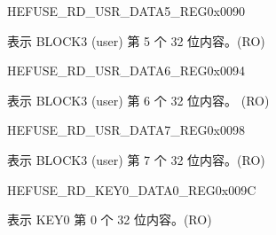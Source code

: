 \begin{register}{H}{EFUSE\_RD\_USR\_DATA5\_REG}{0x{}0090}\label{regdesc:EFUSERDUSRDATA5REG}
%
\regnewline%
\begin{regdesc}\begin{reglist}
\label{fielddesc:EFUSEUSRDATA5}\item [EFUSE\_USR\_DATA5] 表示 BLOCK3 (user) 第 5 个 32 位内容。(RO)
\end{reglist}\end{regdesc}
\end{register}


\begin{register}{H}{EFUSE\_RD\_USR\_DATA6\_REG}{0x{}0094}\label{regdesc:EFUSERDUSRDATA6REG}
%
\regnewline%
\begin{regdesc}\begin{reglist}
\label{fielddesc:EFUSEUSRDATA6}\item [EFUSE\_USR\_DATA6] 表示 BLOCK3 (user) 第 6 个 32 位内容。 (RO)
\end{reglist}\end{regdesc}
\end{register}


\begin{register}{H}{EFUSE\_RD\_USR\_DATA7\_REG}{0x{}0098}\label{regdesc:EFUSERDUSRDATA7REG}
%
\regnewline%
\begin{regdesc}\begin{reglist}
\label{fielddesc:EFUSEUSRDATA7}\item [EFUSE\_USR\_DATA7] 表示 BLOCK3 (user) 第 7 个 32 位内容。(RO)
\end{reglist}\end{regdesc}
\end{register}


\begin{register}{H}{EFUSE\_RD\_KEY0\_DATA0\_REG}{0x{}009C}\label{regdesc:EFUSERDKEY0DATA0REG}
%
\regnewline%
\begin{regdesc}\begin{reglist}
\label{fielddesc:EFUSEKEY0DATA0}\item [EFUSE\_KEY0\_DATA0] 表示 KEY0 第 0 个 32 位内容。(RO)
\end{reglist}\end{regdesc}
\end{register}


